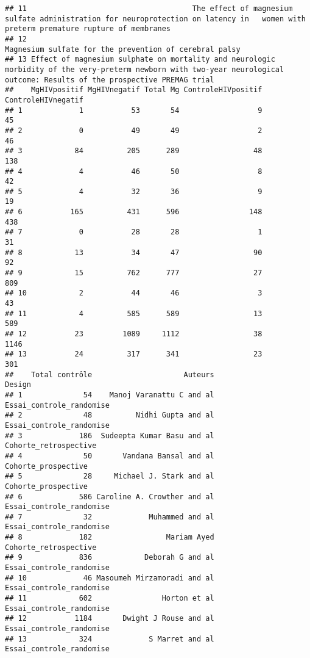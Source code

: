 \documentclass[
]{article}
\begin{document}
\begin{verbatim}
## 11                                      The effect of magnesium sulfate administration for neuroprotection on latency in   women with preterm premature rupture of membranes 
## 12                                                                                                                     Magnesium sulfate for the prevention of cerebral palsy
## 13 Effect of magnesium sulphate on mortality and neurologic morbidity of the very-preterm newborn with two-year neurological outcome: Results of the prospective PREMAG trial
##    MgHIVpositif MgHIVnegatif Total Mg ControleHIVpositif ControleHIVnegatif
## 1             1           53       54                  9                 45
## 2             0           49       49                  2                 46
## 3            84          205      289                 48                138
## 4             4           46       50                  8                 42
## 5             4           32       36                  9                 19
## 6           165          431      596                148                438
## 7             0           28       28                  1                 31
## 8            13           34       47                 90                 92
## 9            15          762      777                 27                809
## 10            2           44       46                  3                 43
## 11            4          585      589                 13                589
## 12           23         1089     1112                 38               1146
## 13           24          317      341                 23                301
##    Total contrôle                     Auteurs                   Design
## 1              54    Manoj Varanattu C and al Essai_controle_randomise
## 2              48          Nidhi Gupta and al Essai_controle_randomise
## 3             186  Sudeepta Kumar Basu and al    Cohorte_retrospective
## 4              50       Vandana Bansal and al      Cohorte_prospective
## 5              28     Michael J. Stark and al      Cohorte_prospective
## 6             586 Caroline A. Crowther and al Essai_controle_randomise
## 7              32             Muhammed and al Essai_controle_randomise
## 8             182                 Mariam Ayed    Cohorte_retrospective
## 9             836            Deborah G and al Essai_controle_randomise
## 10             46 Masoumeh Mirzamoradi and al Essai_controle_randomise
## 11            602                Horton et al Essai_controle_randomise
## 12           1184       Dwight J Rouse and al Essai_controle_randomise
## 13            324             S Marret and al Essai_controle_randomise

\end{verbatim}
\end{document}
